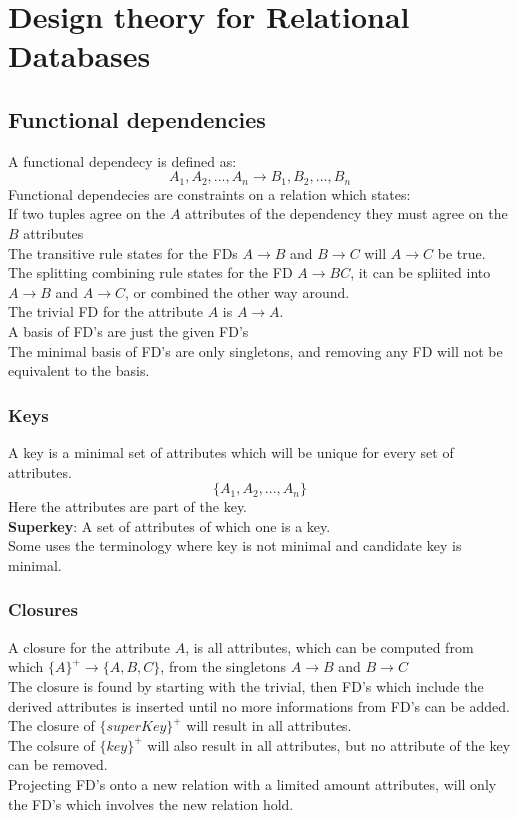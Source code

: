 \documentclass[12pt, a4paper]{article}
\begin{document}
		
	\section{Design theory for Relational Databases}
		\subsection{Functional dependencies}
			A functional dependecy is defined as:
			$$A_1,A_2,...,A_n \rightarrow B_1,B_2,...,B_n$$
			Functional dependecies are constraints on a relation which states: \\
			If two tuples agree on the $A$ attributes of the dependency they must agree on the $B$ attributes\\
			The transitive rule states for the FDs $A\rightarrow B$ and $B\rightarrow C$ will $A\rightarrow C$ be true.\\
			The splitting combining rule states for the FD $A\rightarrow BC$, it can be spliited into $A\rightarrow B$ and $A\rightarrow C$, or combined the other way around.\\
			The trivial FD for the attribute $A$ is $A\rightarrow A$.\\
			A basis of FD's are just the given FD's\\
			The minimal basis of FD's are only singletons, and removing any FD will not be equivalent to the basis.\\ 
		\subsubsection{Keys}
			A key is a minimal set of attributes which will be unique for every set of attributes.\\
			$$\{A_1,A_2,...,A_n\}$$
			Here the attributes are part of the key.\\
			\textbf{Superkey}: A set of attributes of which one is a key.\\
			Some uses the terminology where key is not minimal and candidate key is minimal.\\
		\subsubsection{Closures}
				  A closure for the attribute $A$, is all attributes, which can be computed from which $\{A\}^+\rightarrow \{A,B,C\}$, from the singletons $A\rightarrow B$ and $B\rightarrow C$\\
				  The closure is found by starting with the trivial, then FD's which include the derived attributes is inserted until no more informations from FD's can be added.\\
				  The closure of $\{superKey\}^+$ will result in all attributes.\\
				  The colsure of $\{key\}^+$ will also result in all attributes, but no attribute of the key can be removed.\\
				  Projecting FD's onto a new relation with a limited amount attributes, will only the FD's which involves the new relation hold.
\end{document}
